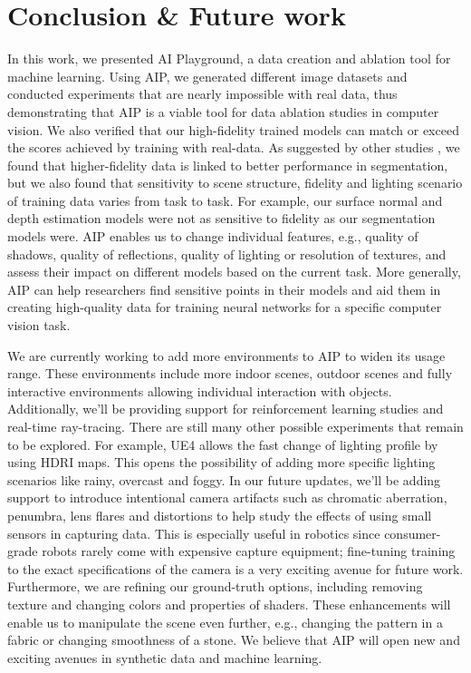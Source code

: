 \documentclass[runningheads]{llncs}
\begin{document}
\section{Conclusion \& Future work}
\label{sec:conclusions}
\vspace{-0.5em}
In this work, we presented AI Playground, a data creation and ablation tool for machine learning. Using AIP, we generated different image datasets and conducted experiments that are nearly impossible with real data, thus demonstrating that AIP is a viable tool for data ablation studies in computer vision. We also verified that our high-fidelity trained models can match or exceed the scores achieved by training with real-data. As suggested by other studies  \cite{7926706_photo_realism,Photorealism2,photorealism3, datafromgames}, we found that higher-fidelity data is linked to better performance in segmentation, but we also found that sensitivity to scene structure, fidelity and lighting scenario of training data varies from task to task. For example, our surface normal and depth estimation models were not as sensitive to fidelity as our segmentation models were. AIP enables us to change individual features, e.g., quality of shadows, quality of reflections, quality of lighting or resolution of textures, and assess their impact on different models based on the current task. More generally, AIP can help researchers find sensitive points in their models and aid them in creating high-quality data for training neural networks for a specific computer vision task.

We are currently working to add more environments to AIP to widen its usage range. These environments include more indoor scenes, outdoor scenes and fully interactive environments allowing individual interaction with objects. Additionally, we'll be providing support for reinforcement learning studies and real-time ray-tracing. There are still many other possible experiments that remain to be explored. For example, UE4 allows the fast change of lighting profile by using HDRI maps. This opens the possibility of adding more specific lighting scenarios like rainy, overcast and foggy. In our future updates, we'll be adding support to introduce intentional camera artifacts such as chromatic aberration, penumbra, lens flares and distortions to help study the effects of using small sensors in capturing data. This is especially useful in robotics since consumer-grade robots rarely come with expensive capture equipment; fine-tuning training to the exact specifications of the camera is a very exciting avenue for future work. Furthermore, we are refining our ground-truth options, including removing texture and changing colors and properties of shaders. These enhancements will enable us to manipulate the scene even further, e.g., changing the pattern in a fabric or changing smoothness of a stone. We believe that AIP will open new and exciting avenues in synthetic data and machine learning.



\end{document}
